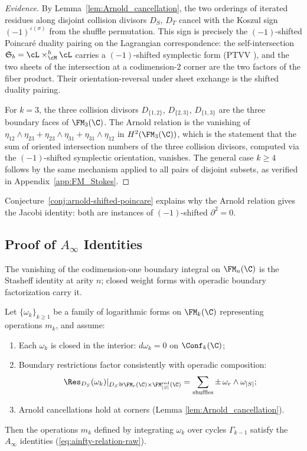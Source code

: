 \begin{proof}[Evidence]
By Lemma~\ref{lem:Arnold_cancellation}, the two orderings of iterated residues along disjoint collision divisors $D_S$, $D_T$ cancel with the Koszul sign $(-1)^{\varepsilon(\sigma)}$ from the shuffle permutation. This sign is precisely the $(-1)$-shifted Poincar\'{e} duality pairing on the Lagrangian correspondence: the self-intersection $\mathfrak{S}_b = \cL \times_{\cM}^h \cL$ carries a $(-1)$-shifted symplectic form (PTVV \cite{PTVV13}), and the two sheets of the intersection at a codimension-$2$ corner are the two factors of the fiber product. Their orientation-reversal under sheet exchange is the shifted duality pairing.

For $k=3$, the three collision divisors $D_{\{1,2\}}$, $D_{\{2,3\}}$, $D_{\{1,3\}}$ are the three boundary faces of $\FM_3(\C)$. The Arnold relation is the vanishing of $\eta_{12}\wedge\eta_{23} + \eta_{23}\wedge\eta_{31} + \eta_{31}\wedge\eta_{12}$ in $H^2(\FM_3(\C))$, which is the statement that the sum of oriented intersection numbers of the three collision divisors, computed via the $(-1)$-shifted symplectic orientation, vanishes. The general case $k \geq 4$ follows by the same mechanism applied to all pairs of disjoint subsets, as verified in Appendix~\ref{app:FM_Stokes}.
\end{proof}

\begin{remark}
\label{rem:corner-poincare}
Conjecture~\ref{conj:arnold-shifted-poincare} explains why the Arnold relation gives the Jacobi identity: both are instances of $(-1)$-shifted $\partial^2 = 0$.
\end{remark}

\subsection{\texorpdfstring{Proof of $A_\infty$ Identities}{Proof of A-infinity Identities}}

The vanishing of the codimension-one boundary integral on $\FM_n(\C)$ is the Stasheff identity at arity $n$; closed weight forms with operadic boundary factorization carry it.

\begin{theorem}
\label{thm:stokes_arnold}
Let $\{\omega_k\}_{k \geq 1}$ be a family of logarithmic forms on $\FM_k(\C)$ representing operations $m_k$, and assume:
\begin{enumerate}[label=(\roman*)]
\item Each $\omega_k$ is closed in the interior: $d\omega_k = 0$ on $\Conf_k(\C)$;
\item Boundary restrictions factor consistently with operadic composition:
\[
\Res_{D_S}(\omega_k)|_{D_S \cong \FM_r(\C) \times \FM_{|S|}^{\mathrm{red}}(\C)} = \sum_{\text{shuffles}} \pm \, \omega_r \wedge \omega_{|S|};
\]
\item Arnold cancellations hold at corners (Lemma \ref{lem:Arnold_cancellation}).
\end{enumerate}
Then the operations $m_k$ defined by integrating $\omega_k$ over cycles $\Gamma_{k-1}$ satisfy the $A_\infty$ identities (\ref{eq:ainfty-relation-raw}).
\end{theorem}

